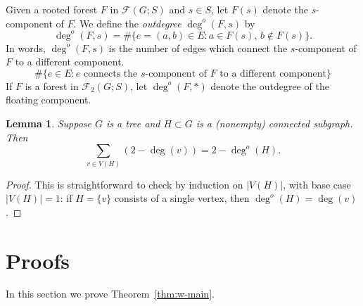 \documentclass{amsart}
\newtheorem{lem}[thm]{Lemma}
\theoremstyle{definition}
\newcommand{\forests}{\mathcal{F}}
\newcommand{\degout}{\deg^o}
\begin{document}
Given a rooted forest $F$ in $\forests(G;S)$ and $s \in S$,
let $F(s)$ denote the $s$-component of $F$.
We define the {\em outdegree} $\degout(F,s)$ by
\begin{equation}
\label{eq:outdeg}
	\degout(F,s) = \#\{ e = (a,b) \in E : a \in F(s),\, b \not\in F(s)\}.
\end{equation}
In words, $\degout(F,s)$ is the number of edges which connect the $s$-component of $F$ to a different component.
$$
\#\{ e \in E : e \text{ connects the $s$-component of $F$ to a different component}\}
$$
If $F$ is a forest in $\forests_2(G;S)$, let $\degout(F,*)$ denote the outdegree of the floating component.

\begin{lem}
\label{lem:outdeg-sum}
Suppose $G$ is a tree and $H\subset G$ is a (nonempty) connected subgraph.
Then
\[
  \sum_{v \in V(H)} \left( 2 -  \deg(v) \right) = 2 - \degout(H) .
\]
\end{lem}
\begin{proof}
This is straightforward to check by induction on $|V(H)|$,
with base case $|V(H)| = 1$:
if $H = \{v\}$ consists of a single vertex, then $\degout(H) = \deg(v)$.
%
\end{proof}


\section{Proofs}
In this section we prove Theorem~\ref{thm:w-main}.
\end{document}
